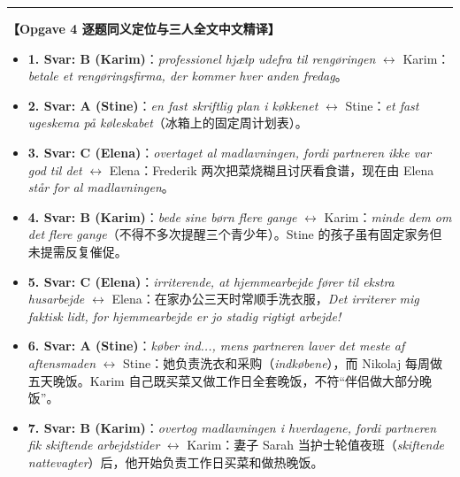 \begin{answerbox}
\vspace{0.45em}
\hrule
\vspace{0.45em}
\textbf{\color{NCDNavy}【Opgave 4 逐题同义定位与三人全文中文精译】}
\begin{itemize}
  \item \textbf{1. Svar: B (Karim)}：\textit{professionel hjælp udefra til rengøringen} $\leftrightarrow$ Karim：\textit{betale et rengøringsfirma, der kommer hver anden fredag}。
  \item \textbf{2. Svar: A (Stine)}：\textit{en fast skriftlig plan i køkkenet} $\leftrightarrow$ Stine：\textit{et fast ugeskema på køleskabet}（冰箱上的固定周计划表）。
  \item \textbf{3. Svar: C (Elena)}：\textit{overtaget al madlavningen, fordi partneren ikke var god til det} $\leftrightarrow$ Elena：Frederik 两次把菜烧糊且讨厌看食谱，现在由 Elena \textit{står for al madlavningen}。
  \item \textbf{4. Svar: B (Karim)}：\textit{bede sine børn flere gange} $\leftrightarrow$ Karim：\textit{minde dem om det flere gange}（不得不多次提醒三个青少年）。Stine 的孩子虽有固定家务但未提需反复催促。
  \item \textbf{5. Svar: C (Elena)}：\textit{irriterende, at hjemmearbejde fører til ekstra husarbejde} $\leftrightarrow$ Elena：在家办公三天时常顺手洗衣服，\textit{Det irriterer mig faktisk lidt, for hjemmearbejde er jo stadig rigtigt arbejde!}
  \item \textbf{6. Svar: A (Stine)}：\textit{køber ind..., mens partneren laver det meste af aftensmaden} $\leftrightarrow$ Stine：她负责洗衣和采购（\textit{indkøbene}），而 Nikolaj 每周做五天晚饭。Karim 自己既买菜又做工作日全套晚饭，不符“伴侣做大部分晚饭”。
  \item \textbf{7. Svar: B (Karim)}：\textit{overtog madlavningen i hverdagene, fordi partneren fik skiftende arbejdstider} $\leftrightarrow$ Karim：妻子 Sarah 当护士轮值夜班（\textit{skiftende nattevagter}）后，他开始负责工作日买菜和做热晚饭。
\end{itemize}


\end{answerbox}
